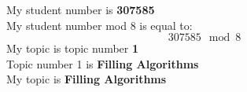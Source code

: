 \documentclass{report}
\begin{document}
My student number is \textbf{307585} \\ 
My student number mod 8 is equal to: 
\[ 307585 \mod 8 \]
My topic is topic number \textbf{1} \\ 
Topic number 1 is \textbf{Filling Algorithms} \\
My topic is \textbf{Filling Algorithms} 
\end{document}
